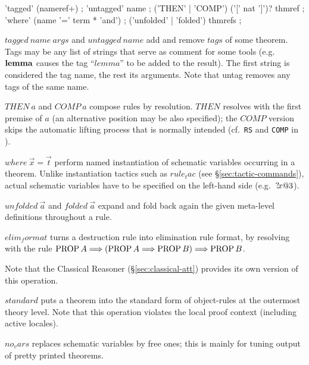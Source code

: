 \begin{rail}
  'tagged' (nameref+)
  ;
  'untagged' name
  ;
  ('THEN' | 'COMP') ('[' nat ']')? thmref
  ;
  'where' (name '=' term * 'and')
  ;
  ('unfolded' | 'folded') thmrefs
  ;
\end{rail}

\begin{descr}

\item [$tagged~name~args$ and $untagged~name$] add and remove $tags$ of some
  theorem.  Tags may be any list of strings that serve as comment for some
  tools (e.g.\ ${\mathord{\mathbf{lemma}}}$ causes the tag ``$lemma$'' to be added to the
  result).  The first string is considered the tag name, the rest its
  arguments.  Note that untag removes any tags of the same name.

\item [$THEN~a$ and $COMP~a$] compose rules by resolution.  $THEN$ resolves
  with the first premise of $a$ (an alternative position may be also
  specified); the $COMP$ version skips the automatic lifting process that is
  normally intended (cf.\ \texttt{RS} and \texttt{COMP} in
  \cite[\S5]{isabelle-ref}).

\item [$where~\vec x = \vec t$] perform named instantiation of schematic
  variables occurring in a theorem.  Unlike instantiation tactics such as
  $rule_tac$ (see \S\ref{sec:tactic-commands}), actual schematic variables
  have to be specified on the left-hand side (e.g.\ ${?\!x@3}$).

\item [$unfolded~\vec a$ and $folded~\vec a$] expand and fold back again the
  given meta-level definitions throughout a rule.

\item [$elim_format$] turns a destruction rule into elimination rule format,
  by resolving with the rule $\mathop{\mathrm{PROP}} A \Longrightarrow (\mathop{\mathrm{PROP}} A \Longrightarrow \mathop{\mathrm{PROP}} B) \Longrightarrow \mathop{\mathrm{PROP}}
  B$.

  Note that the Classical Reasoner (\S\ref{sec:classical-att}) provides its
  own version of this operation.

\item [$standard$] puts a theorem into the standard form of object-rules at
  the outermost theory level.  Note that this operation violates the local
  proof context (including active locales).

\item [$no_vars$] replaces schematic variables by free ones; this is mainly
  for tuning output of pretty printed theorems.

\end{descr}


